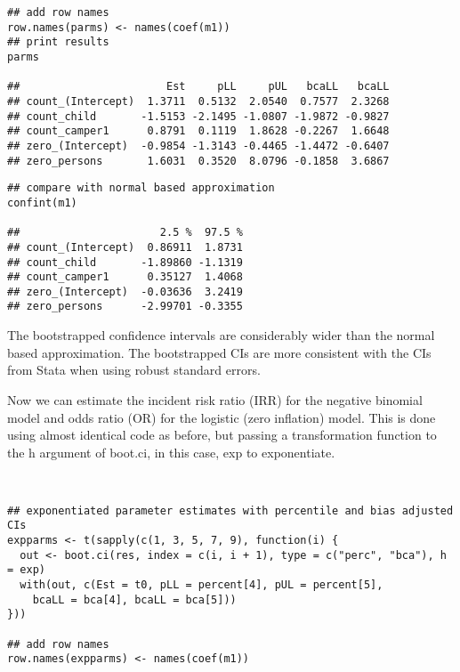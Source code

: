 \documentclass[MASTER.tex]{subfiles}
\begin{document}
\begin{frame}[fragile]
\begin{verbatim}
## add row names
row.names(parms) <- names(coef(m1))
## print results
parms
 
##                       Est     pLL     pUL   bcaLL   bcaLL
## count_(Intercept)  1.3711  0.5132  2.0540  0.7577  2.3268
## count_child       -1.5153 -2.1495 -1.0807 -1.9872 -0.9827
## count_camper1      0.8791  0.1119  1.8628 -0.2267  1.6648
## zero_(Intercept)  -0.9854 -1.3143 -0.4465 -1.4472 -0.6407
## zero_persons       1.6031  0.3520  8.0796 -0.1858  3.6867
\end{verbatim}
\end{frame}
\begin{frame}[fragile]
	\begin{verbatim}
## compare with normal based approximation
confint(m1)
 
##                      2.5 %  97.5 %
## count_(Intercept)  0.86911  1.8731
## count_child       -1.89860 -1.1319
## count_camper1      0.35127  1.4068
## zero_(Intercept)  -0.03636  3.2419
## zero_persons      -2.99701 -0.3355
\end{verbatim}
\end{frame}
\begin{frame}[fragile]

The bootstrapped confidence intervals are considerably wider than the normal based approximation. The bootstrapped CIs are more consistent with the CIs from Stata when using robust standard errors.

Now we can estimate the incident risk ratio (IRR) for the negative binomial model and odds ratio (OR) for the logistic (zero inflation) model. This is done using almost identical code as before, but passing a transformation function to the h argument of boot.ci, in this case, exp to exponentiate.
\end{frame}
\begin{frame}[fragile]
\begin{verbatim}


## exponentiated parameter estimates with percentile and bias adjusted CIs
expparms <- t(sapply(c(1, 3, 5, 7, 9), function(i) {
  out <- boot.ci(res, index = c(i, i + 1), type = c("perc", "bca"), h = exp)
  with(out, c(Est = t0, pLL = percent[4], pUL = percent[5],
    bcaLL = bca[4], bcaLL = bca[5]))
}))

## add row names
row.names(expparms) <- names(coef(m1))
\end{verbatim}
\end{frame}
\end{document}
